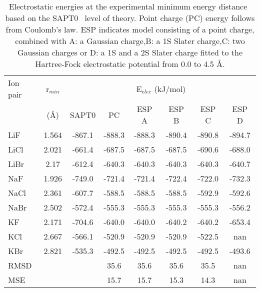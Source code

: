 \begin{table}[ht]
\centering
\caption{Electrostatic energies at the experimental minimum energy distance~\cite{NISTa} based on the SAPT0~\cite{Sherill2013a} level of theory. Point charge (PC) energy follows from Coulomb's law. ESP indicates model  consisting of a point charge, combined with A:  a Gaussian charge,B:  a 1S Slater charge,C:  two Gaussian charges or D:  a 1S and a 2S Slater charge fitted to the Hartree-Fock electrostatic potential from 0.0 to 4.5 {\AA}.}
\label{tab:sapt100}
\begin{tabular}{lccccccc}
\hline
Ion pair & r$_{min}$ & \multicolumn{6}{c}{E$_{elec}$ (kJ/mol)}\\
& ({\AA})&                 SAPT0 & PC  & ESP A  & ESP B  & ESP C  & ESP D \\
\hline
LiF & 1.564 & -867.1 & -888.3  & -888.3 & -890.4 & -890.8 & -894.7\\
LiCl & 2.021 & -661.4 & -687.5  & -687.5 & -687.5 & -690.6 & -688.0\\
LiBr & 2.17 & -612.4 & -640.3  & -640.3 & -640.3 & -640.3 & -640.7\\
NaF & 1.926 & -749.0 & -721.4  & -721.4 & -722.4 & -722.0 & -732.3\\
NaCl & 2.361 & -607.7 & -588.5  & -588.5 & -588.5 & -592.9 & -592.6\\
NaBr & 2.502 & -572.4 & -555.3  & -555.3 & -555.3 & -555.3 & -556.2\\
KF & 2.171 & -704.6 & -640.0  & -640.0 & -640.2 & -640.2 & -653.4\\
KCl & 2.667 & -566.1 & -520.9  & -520.9 & -520.9 & -522.5 & nan\\
KBr & 2.821 & -535.3 & -492.5  & -492.5 & -492.5 & -492.5 & -493.6\\
\hline
RMSD & & & 35.6 & 35.6 & 35.6 & 35.5 & nan\\
MSE & & & 15.7 & 15.7 & 15.3 & 14.3 & nan\\
\hline
\end{tabular}
\end{table}
